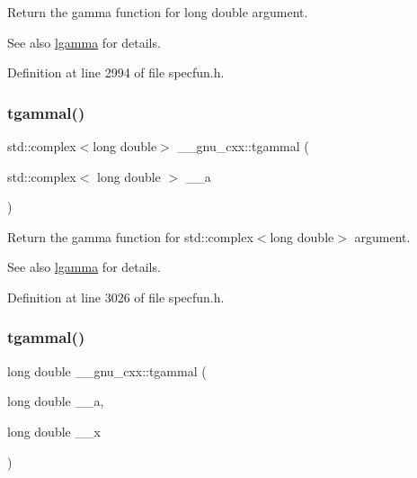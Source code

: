 Return the gamma function for {\ttfamily  long double } argument.

\begin{DoxySeeAlso}{See also}
\hyperlink{group__gnu__math__spec__func_ga40fa5127f7c419ed1d8f1c6a6f96ea9b}{lgamma} for details. 
\end{DoxySeeAlso}


Definition at line 2994 of file specfun.\+h.

\mbox{\label{group__gnu__math__spec__func_ga8d53515dba9c860fd6058a4b75aaff58}} 
\subsubsection{\texorpdfstring{tgammal()}{tgammal()}\hspace{0.1cm}{\footnotesize\ttfamily [2/3]}}
{\footnotesize\ttfamily std\+::complex$<$long double$>$ \+\_\+\+\_\+gnu\+\_\+cxx\+::tgammal (\begin{DoxyParamCaption}\item[{std\+::complex$<$ long double $>$}]{\+\_\+\+\_\+a }\end{DoxyParamCaption})\hspace{0.3cm}{\ttfamily [inline]}}

Return the gamma function for {\ttfamily  std\+::complex$<$long double$>$ } argument.

\begin{DoxySeeAlso}{See also}
\hyperlink{group__gnu__math__spec__func_ga40fa5127f7c419ed1d8f1c6a6f96ea9b}{lgamma} for details. 
\end{DoxySeeAlso}


Definition at line 3026 of file specfun.\+h.

\mbox{\label{group__gnu__math__spec__func_gabebff9ffba6acf55f3a3cd716ef5007a}} 
\subsubsection{\texorpdfstring{tgammal()}{tgammal()}\hspace{0.1cm}{\footnotesize\ttfamily [3/3]}}
{\footnotesize\ttfamily long double \+\_\+\+\_\+gnu\+\_\+cxx\+::tgammal (\begin{DoxyParamCaption}\item[{long double}]{\+\_\+\+\_\+a,  }\item[{long double}]{\+\_\+\+\_\+x }\end{DoxyParamCaption})\hspace{0.3cm}{\ttfamily [inline]}}

